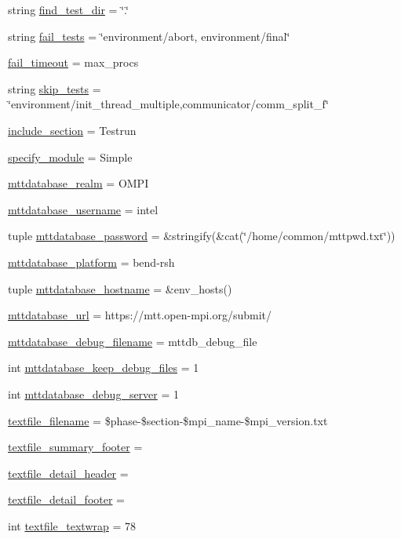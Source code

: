 \begin{DoxyCompactItemize}
string \hyperlink{namespacetest_a8ff2dd5a1198312fe9ada87a755956ab}{find\-\_\-test\-\_\-dir} = \char`\"{}.\char`\"{}
\item 
string \hyperlink{namespacetest_ae0ea3fdd2b6f2c8c3bb11f0afc20a097}{fail\-\_\-tests} = \char`\"{}environment/abort, environment/final\char`\"{}
\item 
\hyperlink{namespacetest_abfd7a3bf875f29c0fe5342e1345eef93}{fail\-\_\-timeout} = max\-\_\-procs
\item 
string \hyperlink{namespacetest_a92bc9c8909f4ebfd33da729397fa6669}{skip\-\_\-tests} = \char`\"{}environment/init\-\_\-thread\-\_\-multiple,communicator/comm\-\_\-split\-\_\-f\char`\"{}
\item 
\hyperlink{namespacetest_ab8d549258085b48d9a6ab8be50b86939}{include\-\_\-section} = Testrun
\item 
\hyperlink{namespacetest_a51dc8620c2e0770b19a7478de3cdfe9f}{specify\-\_\-module} = Simple
\item 
\hyperlink{namespacetest_a710122d20448f56ed2401cc3aa94ba04}{mttdatabase\-\_\-realm} = O\-M\-P\-I
\item 
\hyperlink{namespacetest_a7097267c4c5626a8f8e3376be40a9a92}{mttdatabase\-\_\-username} = intel
\item 
tuple \hyperlink{namespacetest_a51e535ad16f2253bc9fa6509c258a110}{mttdatabase\-\_\-password} = \&stringify(\&cat(\char`\"{}/home/common/mttpwd.\-txt\char`\"{}))
\item 
\hyperlink{namespacetest_ad84ae15a19ed5e82248ae54549e3d0d9}{mttdatabase\-\_\-platform} = bend-\/rsh
\item 
tuple \hyperlink{namespacetest_ade0bfe5e5627318e781e4d494c889bd3}{mttdatabase\-\_\-hostname} = \&env\-\_\-hosts()
\item 
\hyperlink{namespacetest_ad3dde693468cd5e08314bbab4c9f58ef}{mttdatabase\-\_\-url} = https\-://mtt.\-open-\/mpi.\-org/submit/
\item 
\hyperlink{namespacetest_ad8091a4ab1a4450f8e8c7039d81bbd92}{mttdatabase\-\_\-debug\-\_\-filename} = mttdb\-\_\-debug\-\_\-file
\item 
int \hyperlink{namespacetest_a9a41a6defd3632956b1fe345985788f6}{mttdatabase\-\_\-keep\-\_\-debug\-\_\-files} = 1
\item 
int \hyperlink{namespacetest_a3ac6ed984e10925873b601b7c08e0a17}{mttdatabase\-\_\-debug\-\_\-server} = 1
\item 
\hyperlink{namespacetest_a39cdd407082b44f6d5bf56c03b99a745}{textfile\-\_\-filename} = \$phase-\/\$section-\/\$mpi\-\_\-name-\/\$mpi\-\_\-version.\-txt
\item 
\hyperlink{namespacetest_a9cf6c35d175b44931bbc0e7ee120ba6d}{textfile\-\_\-summary\-\_\-footer} =
\item 
\hyperlink{namespacetest_a1149fe2728a88b0d33fdd5606ce953b2}{textfile\-\_\-detail\-\_\-header} =
\item 
\hyperlink{namespacetest_a26400b6c12ab57d038c2ecc468f19645}{textfile\-\_\-detail\-\_\-footer} =
\item 
int \hyperlink{namespacetest_a8f79316c7cc4b1d1ed80e5dbb71a8249}{textfile\-\_\-textwrap} = 78
\end{DoxyCompactItemize}


